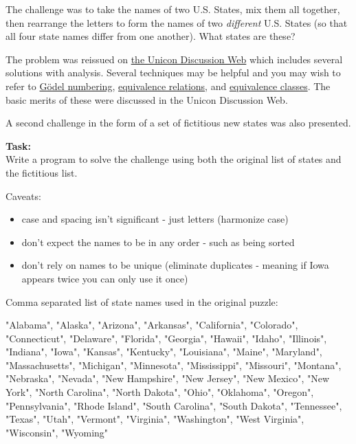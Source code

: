 \begin{itemize}
The challenge was to take the names of two U.S. States, mix them all
together, then rearrange the letters to form the names of two
\emph{different} U.S. States (so that all four state names differ from
one another). What states are these?

The problem was reissued on
\href{https://tapestry.tucson.az.us/twiki/bin/view/Main/StateNamesPuzzle}{the
Unicon Discussion Web} which includes several solutions with analysis.
Several techniques may be helpful and you may wish to refer to
\href{http://en.wikipedia.org/wiki/Goedel\_numbering}{Gödel numbering},
\href{http://en.wikipedia.org/wiki/Equivalence\_relation}{equivalence
relations}, and
\href{http://en.wikipedia.org/wiki/Equivalence\_classes}{equivalence
classes}. The basic merits of these were discussed in the Unicon
Discussion Web.

A second challenge in the form of a set of fictitious new states was
also presented.

\pagebreak{}

\textbf{Task:}\\ Write a program to solve the challenge using both the
original list of states and the fictitious list.

Caveats:

\begin{itemize}
\item
  case and spacing isn't significant - just letters (harmonize case)
\item
  don't expect the names to be in any order - such as being sorted
\item
  don't rely on names to be unique (eliminate duplicates - meaning if
  Iowa appears twice you can only use it once)
\end{itemize}

Comma separated list of state names used in the original puzzle:

\begin{wideverbatim}
    "Alabama", "Alaska", "Arizona", "Arkansas",
    "California", "Colorado", "Connecticut",
    "Delaware",    
    "Florida", "Georgia", "Hawaii",
    "Idaho", "Illinois", "Indiana", "Iowa",
    "Kansas", "Kentucky", "Louisiana",
    "Maine", "Maryland", "Massachusetts", "Michigan",
    "Minnesota", "Mississippi", "Missouri", "Montana",
    "Nebraska", "Nevada", "New Hampshire", "New Jersey",
    "New Mexico", "New York", "North Carolina", "North Dakota",
    "Ohio", "Oklahoma", "Oregon",
    "Pennsylvania", "Rhode Island",
    "South Carolina", "South Dakota", "Tennessee", "Texas",
    "Utah", "Vermont", "Virginia",
    "Washington", "West Virginia", "Wisconsin", "Wyoming"
\end{wideverbatim}


\end{itemize}
